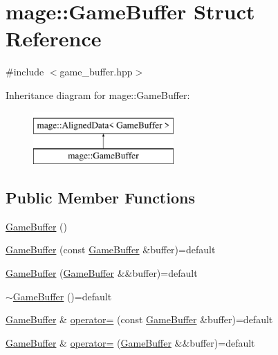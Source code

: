 \hypertarget{structmage_1_1_game_buffer}{}\section{mage\+:\+:Game\+Buffer Struct Reference}
\label{structmage_1_1_game_buffer}


{\ttfamily \#include $<$game\+\_\+buffer.\+hpp$>$}

Inheritance diagram for mage\+:\+:Game\+Buffer\+:\begin{figure}[H]
\begin{center}
\leavevmode
\includegraphics[height=2.000000cm]{structmage_1_1_game_buffer}
\end{center}
\end{figure}
\subsection*{Public Member Functions}
\begin{DoxyCompactItemize}
\item 
\hyperlink{structmage_1_1_game_buffer_ade6ea6f9d04f829d990b848f9e210349}{Game\+Buffer} ()
\item 
\hyperlink{structmage_1_1_game_buffer_a654d6f8d44dcc00b6693840125fb81ff}{Game\+Buffer} (const \hyperlink{structmage_1_1_game_buffer}{Game\+Buffer} \&buffer)=default
\item 
\hyperlink{structmage_1_1_game_buffer_a012cbf18353f056094ebc27d19f93ad1}{Game\+Buffer} (\hyperlink{structmage_1_1_game_buffer}{Game\+Buffer} \&\&buffer)=default
\item 
\hyperlink{structmage_1_1_game_buffer_ac1ae097a91a446184b71bb4dd9acf8b4}{$\sim$\+Game\+Buffer} ()=default
\item 
\hyperlink{structmage_1_1_game_buffer}{Game\+Buffer} \& \hyperlink{structmage_1_1_game_buffer_aa21f68c930b1c180aaaeeee95854b021}{operator=} (const \hyperlink{structmage_1_1_game_buffer}{Game\+Buffer} \&buffer)=default
\item 
\hyperlink{structmage_1_1_game_buffer}{Game\+Buffer} \& \hyperlink{structmage_1_1_game_buffer_af699a10b932a9f766acb990edefa03a5}{operator=} (\hyperlink{structmage_1_1_game_buffer}{Game\+Buffer} \&\&buffer)=default
\end{DoxyCompactItemize}
